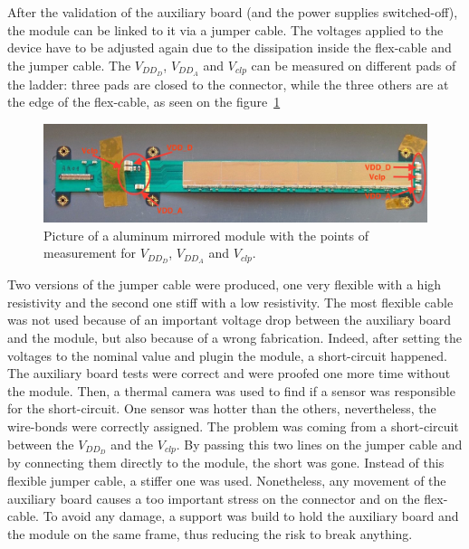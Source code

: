 
  After the validation of the auxiliary board (and the power supplies switched-off), the module can be linked to it via a jumper cable.
  The voltages applied to the device have to be adjusted again due to the dissipation inside the flex-cable and the jumper cable.
  The $V_{DD_D}$, $V_{DD_A}$ and $V_{clp}$ can be measured on different pads of the ladder: three pads are closed to the connector, while the three others are at the edge of the flex-cable, as seen on the figure~\ref{fig:voltagePads}

  \begin{figure}[!h]
    \centering
    \includegraphics[width=\textwidth]{Pictures/labTests/AM01_voltagePads.jpg}
    \caption{Picture of a aluminum mirrored module with the points of measurement for $V_{DD_D}$, $V_{DD_A}$ and $V_{clp}$.}
    \label{fig:voltagePads}
  \end{figure}

  Two versions of the jumper cable were produced, one very flexible with a high resistivity and the second one stiff with a low resistivity.
  The most flexible cable was not used because of an important voltage drop between the auxiliary board and the module, but also because of a wrong fabrication.
  Indeed, after setting the voltages to the nominal value and plugin the module, a short-circuit happened.
  The auxiliary board tests were correct and were proofed one more time without the module.
  Then, a thermal camera was used to find if a sensor was responsible for the short-circuit.
  One sensor was hotter than the others, nevertheless, the wire-bonds were correctly assigned.
  The problem was coming from a short-circuit between the $V_{DD_D}$ and the $V_{clp}$.
  By passing this two lines on the jumper cable and by connecting them directly to the module, the short was gone.
  Instead of this flexible jumper cable, a stiffer one was used.
  Nonetheless, any movement of the auxiliary board causes a too important stress on the connector and on the flex-cable.
  To avoid any damage, a support was build to hold the auxiliary board and the module on the same frame, thus reducing the risk to break anything.

